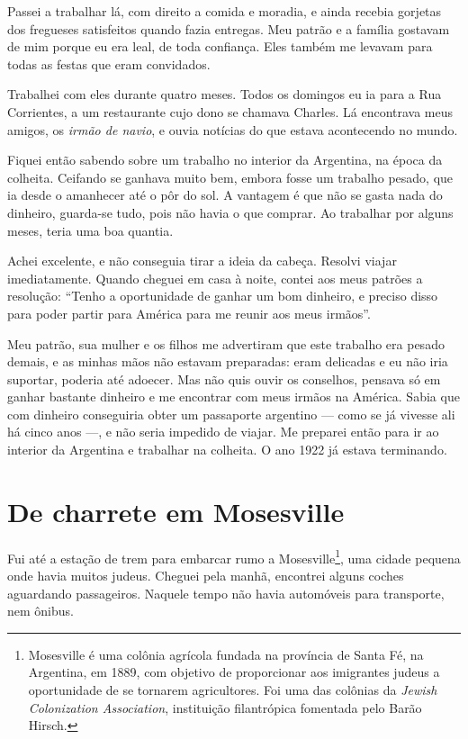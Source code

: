 Passei a trabalhar lá, com direito a comida e moradia, e ainda
recebia gorjetas dos fregueses satisfeitos quando fazia entregas. Meu
patrão e a família gostavam de mim porque eu era leal, de toda
confiança. Eles também me levavam para todas as festas que eram convidados.

Trabalhei com eles durante quatro meses. Todos os domingos eu ia para a Rua
Corrientes, a um restaurante cujo dono se chamava Charles. Lá encontrava meus 
amigos, os \textit{irmão de navio}, e ouvia notícias do
que estava acontecendo no mundo.

Fiquei então sabendo sobre um trabalho no interior da Argentina, na
época da colheita. Ceifando se ganhava muito bem, embora fosse um
trabalho pesado, que ia desde o amanhecer até o pôr do sol. A vantagem é que
não se gasta nada do dinheiro, guarda-se tudo, pois não havia o que
comprar. Ao trabalhar por alguns meses, teria uma boa quantia.

Achei excelente, e não conseguia tirar a ideia da 
cabeça. Resolvi viajar imediatamente. Quando cheguei 
em casa à noite, contei aos meus patrões a resolução: ``Tenho a oportunidade de ganhar um bom dinheiro, e preciso disso para poder 
partir para América para me reunir aos meus irmãos''.

Meu patrão, sua mulher e os filhos me advertiram que este
trabalho era pesado demais, e as minhas mãos não estavam preparadas: eram
delicadas e eu não iria suportar, poderia até adoecer. Mas não
quis ouvir os conselhos, pensava só em ganhar bastante
dinheiro e me encontrar com meus irmãos na América. Sabia que
com dinheiro conseguiria obter um passaporte argentino --- como se já
vivesse ali há cinco anos ---, e não seria impedido 
de viajar. Me preparei então para ir ao interior da
Argentina e trabalhar na colheita. O ano 1922 já estava terminando.

\chapter{De charrete em Mosesville}

Fui até a estação de trem para embarcar rumo a 
Mosesville\footnote{Mosesville é uma colônia agrícola fundada na província de
  Santa Fé, na Argentina, em 1889, com objetivo de proporcionar aos
  imigrantes judeus a oportunidade de se tornarem agricultores. Foi uma
  das colônias da \textit{Jewish Colonization Association}, instituição
  filantrópica fomentada pelo Barão Hirsch.}, uma cidade pequena onde
havia muitos judeus. Cheguei pela manhã, encontrei alguns coches aguardando passageiros. Naquele tempo não havia
automóveis para transporte, nem ônibus.


